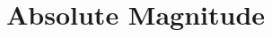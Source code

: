 \hypertarget{group___e_g_x_phys-_absolute_magnitude}{}\section{Absolute Magnitude}
\label{group___e_g_x_phys-_absolute_magnitude}
